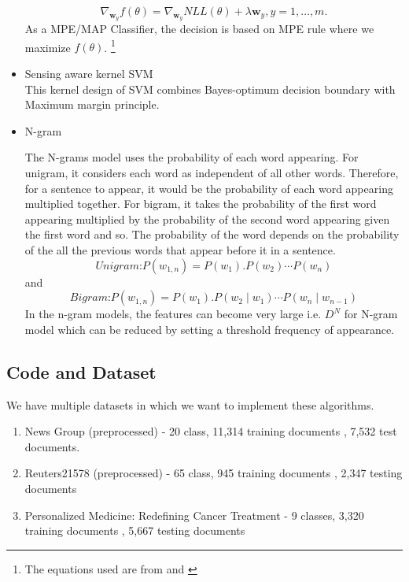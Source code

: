 \documentclass[10pt,twocolumn,letterpaper]{article}
\newcommand\blfootnote[1]{%
	\begingroup
	\renewcommand\thefootnote{}\footnote{#1}%
	\addtocounter{footnote}{-1}%
	\endgroup
}
\begin{document}
\begin{itemize}
	\[\nabla_{\pmb{w}_y}f(\theta) = \nabla_{\pmb{w}_y}NLL(\theta)+\lambda\pmb{w}_{y}, y=1,\ldots,m.\]
	As a MPE/MAP Classifier, the decision is based on MPE rule where we maximize $f(\theta)$. 
	\blfootnote{The equations used are from \cite{song1999general} and \cite{ishwarspring18}}
	\item Sensing aware kernel SVM \cite{ding2014sensing}\\
	This kernel design of SVM combines Bayes-optimum decision boundary with Maximum margin principle. \cite{ding2014sensing}
	\item N-gram
	\par The N-grams model uses the probability of each word appearing. For unigram, it considers each word as independent of all other words. Therefore, for a sentence to appear, it would be the probability of each word appearing multiplied together. For bigram, it takes the probability of the first word appearing multiplied by the probability of the second word appearing given the first word and so. The probability of the word depends on the probability of the all the previous words that appear before it in a sentence. \cite{song1999general} 
	\begin{equation}
	\textit{Unigram:}  P(w_{1,n})  = P(w_1).P(w_2) \cdots P(w_n)
	\end{equation}
	and
	\begin{equation}
	\textit{Bigram:}  P(w_{1,n})  = P(w_1).P(w_2 \mid  w_1) \cdots P(w_n \mid w_{n-1})
	\end{equation}
	In the n-gram models, the features can become very large i.e. $D^N$ for N-gram model which can be reduced by setting a threshold frequency of appearance\cite{furnkranz1998study}.  \\
	
	
	
\end{itemize}

\subsection{Code and Dataset}
We have multiple datasets in which we want to implement these algorithms. 
\begin{enumerate}
	\item News Group (preprocessed) - 20 class, 11,314 training documents ,  7,532 test documents.
	\item Reuters21578 (preprocessed) - 65 class, 945 training documents ,  2,347 testing documents \cite{dataset}
	\item Personalized Medicine: Redefining Cancer Treatment - 9 classes,  3,320 training documents , 5,667 testing documents  \cite{kaggledataset}
\end{enumerate}
\end{document}
